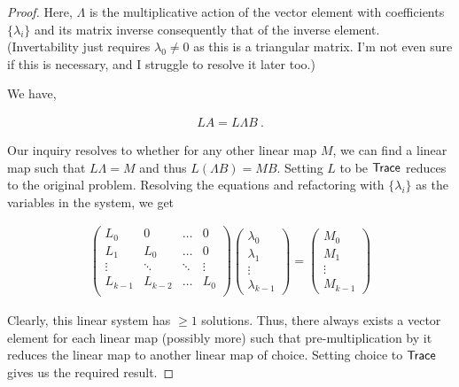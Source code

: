 \begin{alphaparts}
\begin{proof}
        Here, \(\Lambda\) is the multiplicative action of the vector element with
        coefficients \(\{\lambda_i\}\) and its matrix inverse consequently that of
        the inverse element. (Invertability just requires \(\lambda_0 \not = 0\) as
        this is a triangular matrix. I'm not even sure if this is necessary, and I
        struggle to resolve it later too.)
    
        We have,
    
        \begin{gather*}
            L A = L \Lambda B~.
        \end{gather*}
    
        Our inquiry resolves to whether for any other linear map \(M\), we can find
        a linear map such that \(L \Lambda = M\) and thus \(L (\Lambda B) = M B\).
        Setting \(L\) to be \(\textsf{Trace}\) reduces to the original problem. Resolving
        the equations and refactoring with \(\{\lambda_i\}\) as the variables in the
        system, we get 
    
        \begin{gather*}
            \begin{pmatrix}
                L_0 & 0 & \ldots & 0 \\
                L_1 & L_0 & \ldots & 0 \\
                \vdots & \ddots & \ddots & \vdots \\
                L_{k-1} & L_{k-2} & \ldots & L_0 \\
            \end{pmatrix}
            \begin{pmatrix}
                \lambda_0 \\
                \lambda_1 \\
                \vdots \\
                \lambda_{k-1} 
            \end{pmatrix}
            = 
            \begin{pmatrix}
                M_0 \\
                M_1 \\
                \vdots \\
                M_{k-1} 
            \end{pmatrix}
        \end{gather*}
    
        Clearly, this linear system has \(\geq 1\) solutions. Thus, there always
        exists a vector element for each linear map (possibly more) such that
        pre-multiplication by it reduces the linear map to another linear map of
        choice. Setting choice to \(\textsf{Trace}\) gives us the required result.
    \end{proof}


\end{alphaparts}